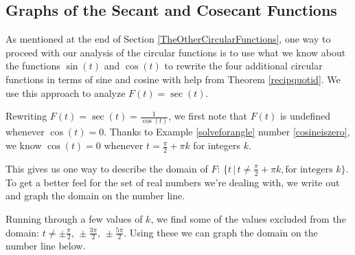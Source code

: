 \documentclass{ximera}
\begin{document}
	\author{Stitz-Zeager}




\setcounter{footnote}{0}

\label{GraphsofOtherCircularFunctions}


\subsection{Graphs of the Secant and Cosecant Functions}
\label{secantcosecantgraphsection}

As mentioned at the end of Section \ref{TheOtherCircularFunctions}, one way to proceed with our analysis of the circular functions is to use what we know about the functions $\sin(t)$ and $\cos(t)$ to rewrite the four additional circular functions in terms of sine and cosine with help from Theorem \ref{recipquotid}.  We use this approach to analyze $F(t) = \sec(t)$.

\smallskip

Rewriting $F(t) = \sec(t)= \frac{1}{\cos(t)}$, we first note that  $F(t)$ is undefined whenever $\cos(t) = 0$.  Thanks to Example \ref{solveforangle} number \ref{cosineiszero}, we know $\cos(t) = 0$ whenever $t = \frac{\pi}{2} + \pi k$ for integers $k$.

\smallskip

This gives us one way to describe the domain of $F$:  $\{ t \, | \, t \neq  \frac{\pi}{2} + \pi k, \text{for integers $k$} \}$.  To get a better feel for the set of real numbers we're dealing with, we write out and graph the domain on the number line.

\smallskip

Running through a few values of $k$, we find some of the values excluded from the domain:   $t \neq  \pm \frac{\pi}{2}, \, \pm \frac{3\pi}{2}, \, \pm \frac{5\pi}{2}$.  Using these we can graph the domain on the number line below.
\end{document}
